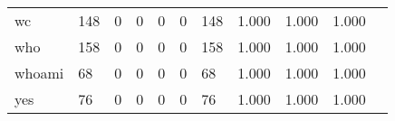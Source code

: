 \begin{longtable}{lp{1.2cm}p{1.2cm}p{1.2cm}p{1.2cm}p{1.2cm}p{1.2cm}p{1.2cm}p{1.2cm}p{1.2cm}p{1.2cm}}
wc        &                                   148 &                                                  0 &                                                  0 &                                                  0 &                                                  0 &                                                148 &                                              1.000 &                                              1.000 &                                              1.000 \\
who       &                                   158 &                                                  0 &                                                  0 &                                                  0 &                                                  0 &                                                158 &                                              1.000 &                                              1.000 &                                              1.000 \\
whoami    &                                    68 &                                                  0 &                                                  0 &                                                  0 &                                                  0 &                                                 68 &                                              1.000 &                                              1.000 &                                              1.000 \\
yes       &                                    76 &                                                  0 &                                                  0 &                                                  0 &                                                  0 &                                                 76 &                                              1.000 &                                              1.000 &                                              1.000 \\
\end{longtable}
